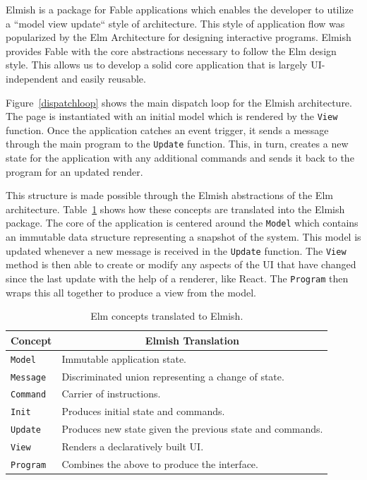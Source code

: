 \documentclass[sigconf]{acmart}
\begin{document}
Elmish is a package for Fable applications which enables the developer to utilize a ``model view update`` style of architecture. This style of application flow was popularized by the Elm Architecture for designing interactive programs. Elmish provides Fable with the core abstractions necessary to follow the Elm design style. This allows us to develop a solid core application that is largely UI-independent and easily reusable. 

Figure~\ref{dispatchloop} shows the main dispatch loop for the Elmish architecture. The page is instantiated with an initial model which is rendered by the \texttt{View} function. Once the application catches an event trigger, it sends a message through the main program to the \texttt{Update} function. This, in turn, creates a new state for the application with any additional commands and sends it back to the program for an updated render.

This structure is made possible through the Elmish abstractions of the Elm architecture. Table~\ref{tab:translate} shows how these concepts are translated into the Elmish package. The core of the application is centered around the \texttt{Model} which contains an immutable data structure representing a snapshot of the system. This model is updated whenever a new message is received in the \texttt{Update} function. The \texttt{View} method is then able to create or modify any aspects of the \textsc{UI} that have changed since the last update with the help of a renderer, like React. The \texttt{Program} then wraps this all together to produce a view from the model.

\begin{table}
  \caption{Elm concepts translated to Elmish.}
  \begin{tabular}{p{1cm}p{6cm}}
    \toprule
    \multicolumn{1}{c}{\textbf{Concept}} &
    \multicolumn{1}{c}{\textbf{Elmish Translation}} \\
    \midrule
     \verb|Model|&Immutable application state.\\
     \verb|Message|&Discriminated union representing a change of state.\\
	 \verb|Command|&Carrier of instructions.\\
     \verb|Init|&Produces initial state and commands.\\
     \verb|Update|&Produces new state given the previous state and commands.\\
     \verb|View|&Renders a declaratively built \textsc{UI}.\\
     \verb|Program|&Combines the above to produce the interface.\\
  \bottomrule
\end{tabular}
\label{tab:translate}
\end{table}
\end{document}
